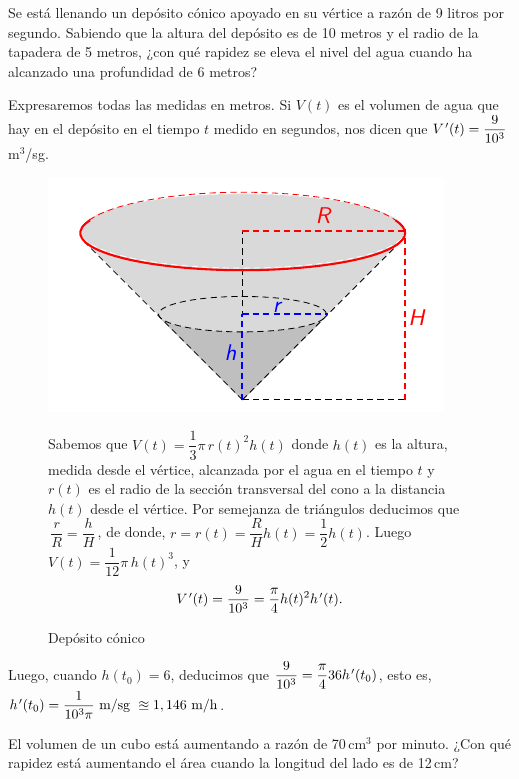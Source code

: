 \begin{ejercicios resueltos}
\resuelto Se está llenando un depósito cónico apoyado en su vértice
a razón de 9 litros por segundo. Sabiendo que la altura del depósito
es de 10 metros y el radio de la tapadera de 5 metros, ¿con qué rapidez
se eleva el nivel del agua cuando ha alcanzado una profundidad de
6 metros?

\sol Expresaremos todas las medidas en metros. Si $V(t)$ es el volumen
de agua que hay en el depósito en el tiempo $t$ medido en segundos,
nos dicen que $V\mbox{$^{\mspace{2mu}\prime}$}(t)=\dfrac{9}{10^{3}}$ m$^{3}$/sg.
\begin{figure}[ht]
\centering{}%
\begin{minipage}[c]{0.45\textwidth}%
\vspace{0pt}
 \centering \includegraphics[scale=0.8]{22_home_antalcides_Calculo_pdf_resuelto1.pdf}
\captionsetup{,singlelinecheck=off,margin=1cm} \caption{Depósito cónico}
%
\end{minipage}%
\begin{minipage}[c]{0.55\textwidth}%
 \vspace{-4pt}
 Sabemos que $V(t)=\dfrac{1}{3}\pi\,r(t)^{2}h(t)$ donde $h(t)$ es
la altura, medida desde el vértice, alcanzada por el agua en el tiempo
$t$ y $r(t)$ es el radio de la sección transversal del cono a la
distancia $h(t)$ desde el vértice. Por semejanza de triángulos deducimos
que $\,\dfrac{r}{R}=\dfrac{h}{H}\,$, de donde, $r=r(t)=\dfrac{R}{H}h(t)=\dfrac{1}{2}h(t)$.
Luego $V(t)=\dfrac{1}{12}\pi\,h(t)^{3}$, y 
\[
V\mbox{$^{\mspace{2mu}\prime}$}(t)=\dfrac{9}{10^{3}}=\dfrac{\pi}{4}h(t)^{2}h\mbox{$^{\mspace{2mu}\prime}$}(t).
\]
%
\end{minipage}
\end{figure}
Luego, cuando $h(t_{0})=6$, deducimos que $\dfrac{9}{10^{3}}=\dfrac{\pi}{4}36h\mbox{$^{\mspace{2mu}\prime}$}(t_{0})$,
esto es, $h\tl(t_{0})=\dfrac{1}{10^{3}\pi}\ \textrm{m/sg}\ \approxeq1,146\ \textrm{m/h}$.\hecho

\resuelto El volumen de un cubo está aumentando a razón de 70\,cm$^{3}$
por minuto. ¿Con qué rapidez está aumentando el área cuando la longitud
del lado es de 12\,cm?


\end{ejercicios resueltos}
